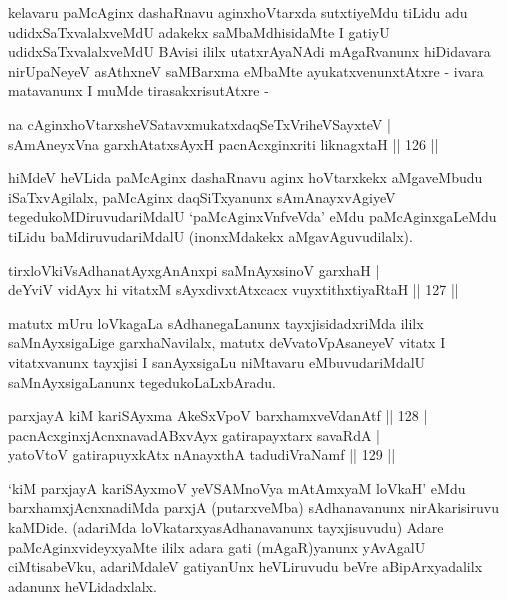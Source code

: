 \begin{artha}
kelavaru paMcAginx dashaRnavu aginxhoVtarxda sutxtiyeMdu tiLidu adu
udidxSaTxvalalxveMdU adakekx saMbaMdhisidaMte I gatiyU
udidxSaTxvalalxveMdU BAvisi ililx utatxrAyaNAdi mAgaRvanunx hiDidavara
nirUpaNeyeV asAthxneV saMBarxma eMbaMte ayukatxvenunxtAtxre - ivara
matavanunx I muMde tirasakxrisutAtxre -
\end{artha}

\begin{shl}
na cAginxhoVtarxsheVSatavxmukatxdaqSeTxVriheVSayxteV | \\
sAmAneyxVna garxhAtatxsAyxH pacnAcxginxriti liknagxtaH \hfill|| 126 || 
\end{shl}

\begin{artha}
hiMdeV heVLida paMcAginx dashaRnavu aginx hoVtarxkekx aMgaveMbudu
iSaTx\-vAgilalx, paMcAginx daqSiTxyanunx sAmAnayxvAgiyeV
tegedukoMDiruvudariMdalU `paMcAginxVnfveVda' eMdu paMcAginxgaLeMdu
tiLidu baMdiruvudariMdalU (inonxMdakekx aMgavAguvudilalx).
\end{artha}

\begin{shl}
tirxloVkiVsAdhanatAyxgAnAnxpi saMnAyxsinoV garxhaH | \\
deYviV vidAyx hi vitatxM sAyxdivxtAtxcacx vuyxtithxtiyaRtaH \hfill|| 127 || 
\end{shl}

\begin{artha}
matutx mUru loVkagaLa sAdhanegaLanunx tayxjisidadxriMda ililx
saMnAyxsigaLige garxhaNavilalx, matutx deVvatoVpAsaneyeV vitatx I
vitatxvanunx tayxjisi I sanAyxsigaLu niMtavaru eMbuvudariMdalU
saMnAyxsigaLanunx tegedukoLaLxbAradu.
\end{artha}


\begin{shl}
parxjayA kiM kariSAyxma AkeSxVpoV barxhamxveVdanAtf \hfill|| 128 | \\
pacnAcxginxjAcnxnavadABxvAyx gatirapayxtarx savaRdA | \\
yatoV\s toV gatirapuyxkAtx nAnayxthA tadudiVraNamf \hfill|| 129 || 
\end{shl}

\begin{artha}
`kiM parxjayA kariSAyxmoV yeVSAMnoV\s ya mAtAmxyaM loVkaH' eMdu barxhamxjAcnxnadiMda parxjA (putarxveMba) sAdhanavanunx  nirAkarisiruvu kaMDide. (adariMda loVkatarxyasAdhanavanunx  tayxjisuvudu) Adare paMcAginxvideyxyaMte ililx adara gati  (mAgaR)yanunx yAvAgalU ciMtisabeVku, adariMdaleV gatiyanUnx  heVLiruvudu beVre aBipArxyadalilx adanunx heVLidadxlalx.
\end{artha}

